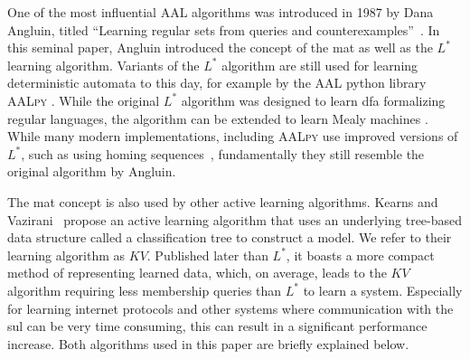 One of the most influential AAL algorithms was introduced in 1987 by Dana Angluin, titled ``Learning regular sets from queries and counterexamples''~\parencite{ANGLUIN198787}. In this seminal paper, Angluin introduced the concept of the \ac{mat} as well as the $L^*$ learning algorithm. Variants of the $L^*$ algorithm are still used for learning deterministic automata to this day, for example by the AAL python library \textsc{AALpy} \parencite{muvskardin2022aalpy}. While the original $L^*$ algorithm was designed to learn \ac{dfa} formalizing regular languages, the algorithm can be extended to learn Mealy machines \parencite{Niese2003AnIA}. While many modern implementations, including \textsc{AALpy} use improved versions of $L^*$, such as using homing sequences~\parencite{Rivest1993Inference}, fundamentally they still resemble the original algorithm by Angluin.

The \ac{mat} concept is also used by other active learning algorithms. Kearns and Vazirani~\parencite{KV1994} propose an active learning algorithm that uses an underlying tree-based data structure called a classification tree to construct a model. We refer to their learning algorithm as $KV$. Published later than $L^*$, it boasts a more compact method of representing learned data, which, on average, leads to the $KV$ algorithm requiring less membership queries than $L^*$ to learn a system. Especially for learning internet protocols and other systems where communication with the \ac{sul} can be very time consuming, this can result in a significant performance increase. Both algorithms used in this paper are briefly explained below.

